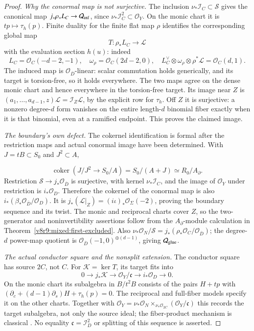 \documentclass[10pt,fleqn]{article}
\numberwithin{equation}{section}
\begin{document}
\begin{proof}
\emph{Why the conormal map is not surjective.}
The inclusion $\nu_*\mathcal I_C\subset\mathcal S$ gives the canonical
map $j_*\rho_*L_C\to\mathcal Q_{\rm inf}$, since
$\nu_*\mathcal I_C^2\subset\mathcal O_Y$.  On the monic chart it is
$tp\mapsto\tau_h(p)$.  Finite duality for the finite flat map $\rho$
\cite[Tags~0BUZ and 0BVE]{Stacks} identifies the corresponding global map
\[
 T:\rho_*L_C\longrightarrow\mathcal L
\]
with the evaluation section $h(u)$: indeed
\[
 L_C=\mathcal O_C(-d-2,-1),\quad
 \omega_\rho=\mathcal O_C(2d-2,0),\quad
 L_C^\vee\otimes\omega_\rho\otimes\rho^*\mathcal L
       =\mathcal O_C(d,1).
\]
The induced map is $\mathcal O_{\overline D}$-linear: scalar commutation
holds generically, and its target is torsion-free, so it holds everywhere.
The two maps agree on the dense monic chart and hence everywhere in the
torsion-free target.  Its image near $Z$ is
$(a_1,\ldots,a_{d-1},z)\mathcal L=\mathcal I_Z\mathcal L$, by the
explicit row for $\tau_h$.  Off $Z$ it is surjective: a nonzero degree-$d$
form vanishes on the entire length-$d$ binomial fiber exactly when it is
that binomial, even at a ramified endpoint.  This proves the claimed image.

\emph{The boundary's own defect.}
The cokernel identification is formal after the restriction maps and
actual conormal image have been determined.  With $J=tB\subset S_0$
and $J^2\subset A$,

\[
 \operatorname{coker}(J/J^2\longrightarrow S_0/A)
   =S_0/(A+J)\simeq R_0/A_\partial.
\]
Restriction $\mathcal S\to j_*\mathcal O_{\overline D}$ is surjective,
with kernel $\nu_*\mathcal I_C$, and the image of $\mathcal O_Y$ under
restriction is $i_*\mathcal O_D$.  Therefore the cokernel of the conormal
map is also $i_*(\beta_*\mathcal O_{\overline D}/\mathcal O_D)$.
It is $j_*(\mathcal L|_Z)= (i\iota)_*\mathcal O_\Sigma(-2)$,
proving the boundary sequence and its twist.
The monic and reciprocal charts cover $Z$, so the two-generator and
noninvertibility assertions follow from the $A_\partial$-module
calculation in Theorem~\ref{v8r9:mixed:first-excluded}.
Also $\nu_*\mathcal O_N/\mathcal S=
 j_*(\rho_*\mathcal O_C/\mathcal O_{\overline D})$;
the degree-$d$ power-map quotient is
$\mathcal O_{\overline D}(-1,0)^{\oplus(d-1)}$, giving $\mathcal Q_{\rm glue}$.

\emph{The actual conductor square and the nonsplit extension.}
The conductor square has source $2C$, not $C$.  For
$\mathcal K=\ker T$, its target fits into
\[
 0\longrightarrow j_*\mathcal K\longrightarrow
       \mathcal O_Y/\mathfrak c\longrightarrow i_*\mathcal O_D
       \longrightarrow0.
\]
On the monic chart its subalgebra in $B/t^2B$ consists of the pairs
$H+tp$ with $(\partial_c+(d-1)\partial_s)H+\tau_h(p)=0$.
The reciprocal and full-fiber models specify it on the other charts.
Together with
$\mathcal O_Y=\nu_*\mathcal O_N\times_{\nu_*\mathcal O_{2C}}
(\mathcal O_Y/\mathfrak c)$ this records the target subalgebra, not only
the source ideal; the fiber-product mechanism is classical
\cite[Lemma~1.3]{Ferrand}.  No equality $\mathfrak c=\mathcal I_D^2$
or splitting of this sequence is asserted.


\end{proof}
\end{document}
